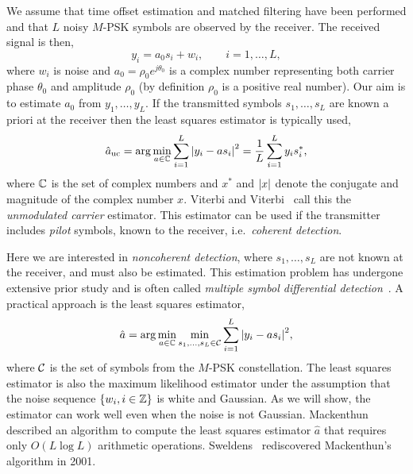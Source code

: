 \documentclass[conference]{IEEEtran}
\begin{document}
We assume that time offset estimation and matched filtering have been performed and that $L$ noisy $M$-PSK symbols are observed by the receiver.  The received signal is then,
\begin{equation}\label{eq:sigmod}
y_i = a_0 s_i + w_i, \qquad i = 1, \dots, L,
\end{equation}
where $w_i$ is noise and $a_0 = \rho_0 e^{j\theta_0}$ is a complex number representing both carrier phase $\theta_0$ and amplitude $\rho_0$ (by definition $\rho_0$ is a positive real number).  Our aim is to estimate $a_0$ from $y_1, \dots, y_L$.  If the transmitted symbols $s_1, \dots, s_L$ are known a priori at the receiver then the least squares estimator is typically used,
\begin{equation}\label{eq:hataumod}
\hat{a}_{\text{uc}} = \arg \min_{a \in {\mathbb C}} \sum_{i = 1}^L {\left\vert  y_i - a s_i  \right\vert}^2  = \frac{1}{L} \sum_{i = 1}^L y_i s_i^*,
\end{equation}
where ${\mathbb C}$ is the set of complex numbers and $x^*$ and ${\left\vert x \right\vert}$ denote the conjugate and magnitude of the complex number $x$.  Viterbi and Viterbi~\cite{ViterbiViterbi_phase_est_1983} call this the \emph{unmodulated carrier} estimator.  This estimator can be used if the transmitter includes \emph{pilot} symbols, known to the receiver, i.e.~\emph{coherent detection}.

Here we are interested in \emph{noncoherent detection}, where $s_1, \dots, s_L$ are not known at the receiver, and must also be estimated.  This estimation problem has undergone extensive prior study and is often called \emph{multiple symbol differential detection}~\cite{ViterbiViterbi_phase_est_1983,Cowley_ref_sym_carr_1998,Wilson1989,Makrakis1990,Liu1991,Mackenthun1994,Sweldens2001,McKilliamLinearTimeBlockPSK2009}.  A practical approach is the least squares estimator,
\begin{equation}\label{eq:hatadef}
\hat{a} = \arg\min_{a \in {\mathbb C}} \min_{s_1, \dots, s_L \in \mathcal C} \sum_{i = 1}^L {\left\vert  y_i - a s_i  \right\vert}^2,
\end{equation}
where $\mathcal C$ is the set of symbols from the $M$-PSK constellation.  The least squares estimator is also the maximum likelihood estimator under the assumption that the noise sequence $\{w_i, i \in {\mathbb Z}\}$ is white and Gaussian.  As we will show, the estimator can work well even when the noise is not Gaussian.  Mackenthun~\cite{Mackenthun1994} described an algorithm to compute the least squares estimator $\hat{a}$ that requires only $O(L \log L)$ arithmetic operations.  Sweldens~\cite{Sweldens2001} rediscovered Mackenthun's algorithm in 2001.
\end{document}
